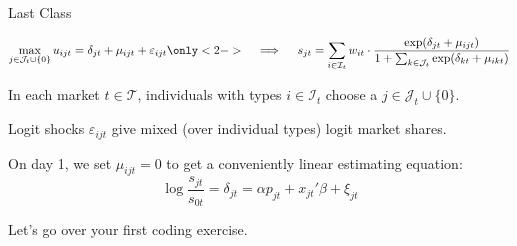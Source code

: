\documentclass[aspectratio=169,t,11pt,table]{beamer}
\begin{document}

\begin{frame}{Last Class}
    \vspace{-\baselineskip}
    \begin{minipage}[c][4\baselineskip][c]{\textwidth}
        \begin{equation*}
            \max_{j \in \mathcal{J}_t \cup \{0\}} u_{ijt} = \delta_{jt} + \mu_{ijt} + \varepsilon_{ijt} \only<2->{\quad\implies\quad s_{jt} = \sum_{i \in \mathcal{I}_t} w_{it} \cdot \frac{\exp(\delta_{jt} + \mu_{ijt})}{1 + \sum_{k \in \mathcal{J}_t} \exp(\delta_{kt} + \mu_{ikt})}} 
        \end{equation*}
    \end{minipage}
    \vspace{-0.5\baselineskip}
    \begin{wideitemize}
        \item In each market $t \in \mathcal{T}$, individuals with types $i \in \mathcal{I}_t$ choose a $j \in \mathcal{J}_t \cup\{0\}$.
        \pause
        \item Logit shocks $\varepsilon_{ijt}$ give mixed (over individual types) logit market shares.
        \pause
        \item On day 1, we set $\mu_{ijt} = 0$ to get a conveniently linear estimating equation:
        \begin{equation*}
            \log\frac{s_{jt}}{s_{0t}} = \delta_{jt} = \alpha p_{jt} + x_{jt}'\beta + \xi_{jt}
        \end{equation*}
        \pause
        \item Let's go over your first coding exercise.
    \end{wideitemize}
\end{frame}
\end{document}
